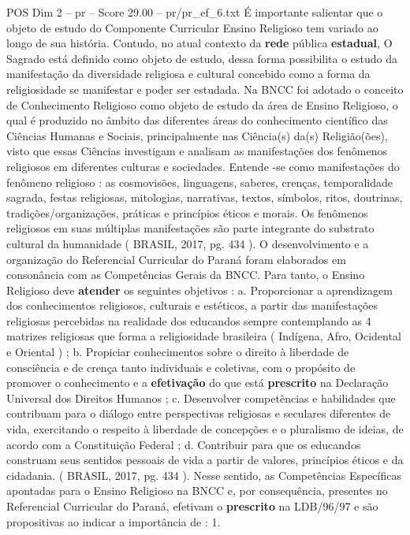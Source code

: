 \begin{textsample}{POS Dim 2 – pr – Score 29.00 – pr/pr\_ef\_6.txt}
É importante salientar que o objeto de estudo do Componente Curricular Ensino Religioso tem variado ao longo de sua história.
Contudo, no atual contexto da \textbf{rede} pública \textbf{estadual}, O Sagrado está definido como objeto de estudo, dessa forma possibilita o estudo da manifestação da diversidade religiosa e cultural concebido como a forma da religiosidade se manifestar e poder ser estudada.
Na BNCC foi adotado o conceito de Conhecimento Religioso como objeto de estudo da área de Ensino Religioso, o qual é produzido no âmbito das diferentes áreas do conhecimento científico das Ciências Humanas e Sociais, principalmente nas Ciência(s) da(s) Religião(ões), visto que essas Ciências investigam e analisam as manifestações dos fenômenos religiosos em diferentes culturas e sociedades.
Entende -se como manifestações do fenômeno religioso : as cosmovisões, linguagens, saberes, crenças, temporalidade sagrada, festas religiosas, mitologias, narrativas, textos, símbolos, ritos, doutrinas, tradições/organizações, práticas e princípios éticos e morais.
Os fenômenos religiosos em suas múltiplas manifestações são parte integrante do substrato cultural da humanidade ( BRASIL, 2017, pg. 434 ).
O desenvolvimento e a organização do Referencial Curricular do Paraná foram elaborados em consonância com as Competências Gerais da BNCC.
Para tanto, o Ensino Religioso deve \textbf{atender} os seguintes objetivos : a.
Proporcionar a aprendizagem dos conhecimentos religiosos, culturais e estéticos, a partir das manifestações religiosas percebidas na realidade dos educandos sempre contemplando as 4 matrizes religiosas que forma a religiosidade brasileira ( Indígena, Afro, Ocidental e Oriental ) ; b.
Propiciar conhecimentos sobre o direito à liberdade de consciência e de crença tanto individuais e coletivas, com o propósito de promover o conhecimento e a \textbf{efetivação} do que está \textbf{prescrito} na Declaração Universal dos Direitos Humanos ; c.
Desenvolver competências e habilidades que contribuam para o diálogo entre perspectivas religiosas e seculares diferentes de vida, exercitando o respeito à liberdade de concepções e o pluralismo de ideias, de acordo com a Constituição Federal ; d.
Contribuir para que os educandos construam seus sentidos pessoais de vida a partir de valores, princípios éticos e da cidadania. ( BRASIL, 2017, pg. 434 ).
Nesse sentido, as Competências Específicas apontadas para o Ensino Religioso na BNCC e, por consequência, presentes no Referencial Curricular do Paraná, efetivam o \textbf{prescrito} na LDB/96/97 e são propositivas ao indicar a importância de : 1.

\end{textsample}
